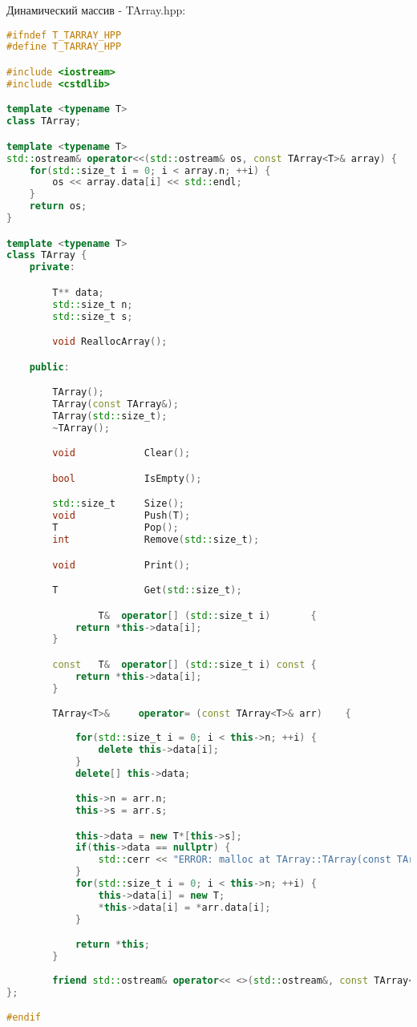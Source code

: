 Динамический массив - TArray.hpp:
\begin{lstlisting}[language=C++]
#ifndef T_TARRAY_HPP
#define T_TARRAY_HPP

#include <iostream>
#include <cstdlib>

template <typename T>
class TArray;

template <typename T>
std::ostream& operator<<(std::ostream& os, const TArray<T>& array) {
    for(std::size_t i = 0; i < array.n; ++i) {
        os << array.data[i] << std::endl;
    }
    return os;
}

template <typename T>
class TArray {
    private:

        T** data;
        std::size_t n;
        std::size_t s;

        void ReallocArray();

    public:

        TArray();
        TArray(const TArray&);
        TArray(std::size_t);
        ~TArray();

        void            Clear();

        bool            IsEmpty();

        std::size_t     Size();
        void            Push(T);
        T               Pop();
        int             Remove(std::size_t);

        void            Print();

        T               Get(std::size_t);

                T&  operator[] (std::size_t i)       { 
            return *this->data[i]; 
        }

        const   T&  operator[] (std::size_t i) const { 
            return *this->data[i]; 
        }

        TArray<T>&     operator= (const TArray<T>& arr)    {
            
            for(std::size_t i = 0; i < this->n; ++i) {
                delete this->data[i];
            }
            delete[] this->data;

            this->n = arr.n;
            this->s = arr.s;

            this->data = new T*[this->s];
            if(this->data == nullptr) {
                std::cerr << "ERROR: malloc at TArray::TArray(const TArray&)!" << std::endl;
            }
            for(std::size_t i = 0; i < this->n; ++i) {
                this->data[i] = new T;
                *this->data[i] = *arr.data[i];
            }

            return *this;
        }
        
        friend std::ostream& operator<< <>(std::ostream&, const TArray<T>&);
};

#endif
\end{lstlisting}

